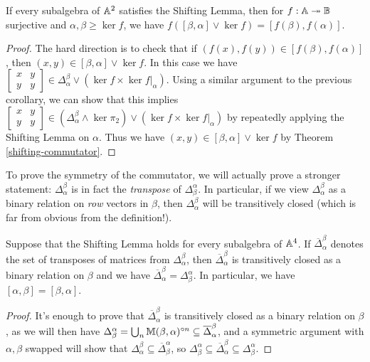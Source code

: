\begin{appendices}
\begin{cor} If every subalgebra of $\mathbb{A}^2$ satisfies the Shifting Lemma, then for $f : \mathbb{A} \twoheadrightarrow \mathbb{B}$ surjective and $\alpha, \beta \ge \ker f$, we have $f([\beta,\alpha]\vee \ker f) = [f(\beta),f(\alpha)]$.
\end{cor}
\begin{proof} The hard direction is to check that if $(f(x), f(y)) \in [f(\beta),f(\alpha)]$, then $(x,y) \in [\beta,\alpha]\vee \ker f$. In this case we have $\begin{bmatrix} x & y\\ y & y\end{bmatrix} \in \Delta_\alpha^\beta \vee (\ker f\times \ker f|_\alpha)$. Using a similar argument to the previous corollary, we can show that this implies $\begin{bmatrix} x & y\\ y & y\end{bmatrix} \in (\Delta_\alpha^\beta \wedge \ker \pi_2) \vee (\ker f\times \ker f|_\alpha)$ by repeatedly applying the Shifting Lemma on $\alpha$. Thus we have $(x,y) \in [\beta,\alpha] \vee \ker f$ by Theorem \ref{shifting-commutator}.
\end{proof}

To prove the symmetry of the commutator, we will actually prove a stronger statement: $\Delta_\alpha^\beta$ is in fact the \emph{transpose} of $\Delta_\beta^\alpha$. In particular, if we view $\Delta_\alpha^\beta$ as a binary relation on \emph{row} vectors in $\beta$, then $\Delta_\alpha^\beta$ will be transitively closed (which is far from obvious from the definition!).

\begin{thm}\label{commutator-transpose} Suppose that the Shifting Lemma holds for every subalgebra of $\mathbb{A}^4$. If $\overline{\Delta}_\alpha^\beta$ denotes the set of transposes of matrices from $\Delta_\alpha^\beta$, then $\overline{\Delta}_\alpha^\beta$ is transitively closed as a binary relation on $\beta$ and we have $\overline{\Delta}_\alpha^\beta = \Delta_\beta^\alpha$. In particular, we have $[\alpha,\beta] = [\beta,\alpha]$.
\end{thm}
\begin{proof} It's enough to prove that $\overline{\Delta}_\alpha^\beta$ is transitively closed as a binary relation on $\beta$, as we will then have $\Delta_\beta^\alpha = \bigcup_n \mathbb{M}(\beta,\alpha)^{\circ n} \subseteq \overline{\Delta}_\alpha^\beta$, and a symmetric argument with $\alpha,\beta$ swapped will show that $\Delta_\alpha^\beta \subseteq \overline{\Delta}_\beta^\alpha$, so $\Delta_\beta^\alpha \subseteq \overline{\Delta}_\alpha^\beta \subseteq \Delta_\beta^\alpha$.


\end{proof}
\end{appendices}
